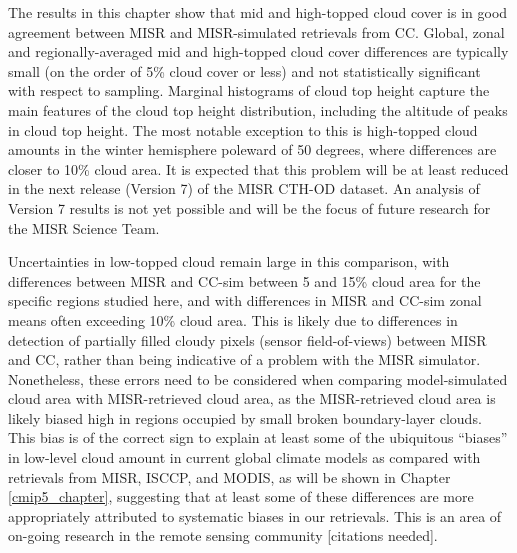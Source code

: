 The results in this chapter show that mid and high-topped cloud cover is in good agreement between MISR and MISR-simulated retrievals from CC. Global, zonal and regionally-averaged mid and high-topped cloud cover differences are typically small (on the order of 5\% cloud cover or less) and not statistically significant with respect to sampling. Marginal histograms of cloud top height capture the main features of the cloud top height distribution, including the altitude of peaks in cloud top height.  The most notable exception to this is high-topped cloud amounts in the winter hemisphere poleward of 50 degrees, where differences are closer to 10\% cloud area.  It is expected that this problem will be at least reduced in the next release (Version 7) of the MISR CTH-OD dataset. An analysis of Version 7 results is not yet possible and will be the focus of future research for the MISR Science Team.

Uncertainties in low-topped cloud remain large in this comparison, with differences between MISR and CC-sim between 5 and 15\% cloud area for the specific regions studied here, and with differences in MISR and CC-sim zonal means often exceeding 10\% cloud area. This is likely due to differences in detection of partially filled cloudy pixels (sensor field-of-views) between MISR and CC, rather than being indicative of a problem with the MISR simulator. Nonetheless, these errors need to be considered when comparing model-simulated cloud area with MISR-retrieved cloud area, as the MISR-retrieved cloud area is likely biased high in regions occupied by small broken boundary-layer clouds. This bias is of the correct sign to explain at least some of the ubiquitous ``biases'' in low-level cloud amount in current global climate models as compared with retrievals from MISR, ISCCP, and MODIS, as will be shown in Chapter \ref{cmip5_chapter}, suggesting that at least some of these differences are more appropriately attributed to systematic biases in our retrievals. This is an area of on-going research in the remote sensing community [citations needed].

